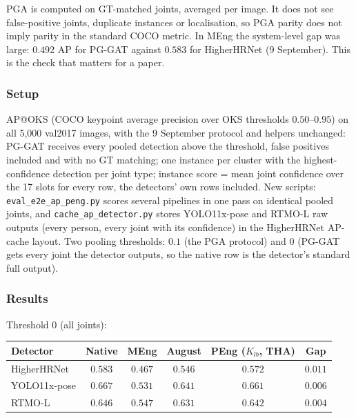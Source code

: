 PGA is computed on GT-matched joints, averaged per image. It does not see false-positive joints, duplicate instances or localisation, so PGA parity does not imply parity in the standard COCO metric. In MEng the system-level gap was large: $0.492$ AP for PG-GAT against $0.583$ for HigherHRNet (9 September). This is the check that matters for a paper.

\subsubsection{Setup}

AP@OKS (COCO keypoint average precision over OKS thresholds $0.50$--$0.95$) on all 5,000 val2017 images, with the 9 September protocol and helpers unchanged: PG-GAT receives every pooled detection above the threshold, false positives included and with no GT matching; one instance per cluster with the highest-confidence detection per joint type; instance score = mean joint confidence over the 17 slots for every row, the detectors' own rows included.
New scripts: \texttt{eval\_e2e\_ap\_peng.py} scores several pipelines in one pass on identical pooled joints, and \texttt{cache\_ap\_detector.py} stores YOLO11x-pose and RTMO-L raw outputs (every person, every joint with its confidence) in the HigherHRNet AP-cache layout.
Two pooling thresholds: $0.1$ (the PGA protocol) and $0$ (PG-GAT gets every joint the detector outputs, so the native row is the detector's standard full output).

\subsubsection{Results}

Threshold 0 (all joints):

\begin{tabular}{lccccc}
\hline
\textbf{Detector} & \textbf{Native} & \textbf{MEng} & \textbf{August} & \textbf{PEng ($K_{lb}$, THA)} & \textbf{Gap} \\
\hline
HigherHRNet   & $0.583$ & $0.467$ & $0.546$ & $\mathbf{0.572}$ & $0.011$ \\
YOLO11x-pose  & $0.667$ & $0.531$ & $0.641$ & $\mathbf{0.661}$ & $0.006$ \\
RTMO-L        & $0.646$ & $0.547$ & $0.631$ & $\mathbf{0.642}$ & $0.004$ \\
\hline
\end{tabular}

\vspace{0.5em}

